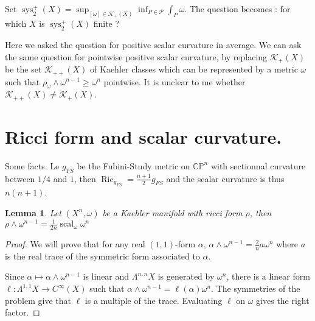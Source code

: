 \documentclass{amsart}
\newtheorem{lemma}[theorem]{Lemma}
\numberwithin{equation}{section}
\theoremstyle {definition}
\DeclareMathOperator{\scal}{scal}
\DeclareMathOperator{\Ric}{Ric}
\DeclareMathOperator{\sys}{sys}
\begin{document}
Set $\sys_2^+(X)=\sup_{[\omega]\in \mathcal{K}_+(X)}\inf_{P\in\mathcal{P}}\int_P\omega$. The question becomes : for which $X$ is $\sys_2^+(X)$ finite ?

Here we asked the question for positive scalar curvature in average. We can ask the same question for pointwise positive scalar curvature, by replacing $\mathcal{K}_+(X)$ be the set $\mathcal{K}_{++}(X)$ of Kaehler classes which can be represented by a metric $\omega$ such that $\rho_\omega\wedge \omega^{n-1}\geq \omega^n$ pointwise. It is unclear to me whether $\mathcal{K}_{++}(X)\neq \mathcal{K}_{+}(X)$.

\appendix
\section{Ricci form and scalar curvature.}

Some facts. Le $g_{FS}$ be the Fubini-Study metric on $\mathbb{CP}^n$ with sectionnal curvature between $1/4$ and $1$, then $\Ric_{g_{FS}}=\frac{n+1}{2}g_{FS}$ and the scalar curvature is thus $n(n+1)$.


\begin{lemma}
    Let $(X^n,\omega)$ be a Kaehler manifold with ricci form $\rho$, then $\rho\wedge \omega^{n-1}=\frac{1}{2n}\scal_\omega\omega^n$
\end{lemma}
\begin{proof}
    We will prove that for any real $(1,1)$-form $\alpha$,
    $\alpha\wedge \omega^{n-1}= \tfrac{2}{n}a\omega^n$ where $a$ is the real trace of the symmetric form associated to $\alpha$.

    Since $\alpha\mapsto \alpha\wedge\omega^{n-1}$ is linear and $\Lambda^{n,n}X$ is generated by $\omega^n$, there is a linear form $\ell:\Lambda^{1,1}X\to C^{\infty}(X)$ such that $\alpha\wedge\omega^{n-1}=\ell(\alpha)\omega^n$. The symmetries of the problem give that $\ell$ is a multiple of the trace. Evaluating $\ell$ on $\omega$ gives the right factor.


\end{proof}
\end{document}
